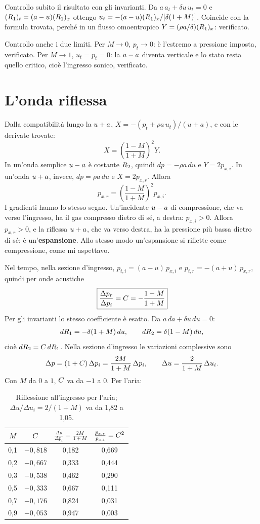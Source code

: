 Controllo subito il risultato con gli invarianti. Da $a\,a_t+\delta u\,u_t=0$ e $(R_1)_t=(a-u)(R_1)_x$ ottengo
$u_t=-(a-u)(R_1)_x/[\delta(1+M)]$. Coincide con la formula trovata, perché in un flusso omoentropico
$Y=(\rho a/\delta)(R_1)_x$: verificato.

Controllo anche i due limiti. Per $M\to0$, $p_t\to0$: è l'estremo a pressione imposta, verificato. Per $M\to1$,
$u_t=p_t=0$: la $u-a$ diventa verticale e lo stato resta quello critico, cioè l'ingresso sonico, verificato.

\section*{L'onda riflessa}
Dalla compatibilità lungo la $u+a$, $X=-(p_t+\rho a\,u_t)/(u+a)$, e con le derivate trovate:
\[
  X=\left(\frac{1-M}{1+M}\right)^2 Y .
\]
In un'onda semplice $u-a$ è costante $R_2$, quindi $dp=-\rho a\,du$ e $Y=2p_{x,i}$. In un'onda $u+a$, invece,
$dp=\rho a\,du$ e $X=2p_{x,r}$. Allora
\[
  p_{x,r}=\left(\frac{1-M}{1+M}\right)^2 p_{x,i}.
\]
I gradienti hanno lo stesso segno. Un'incidente $u-a$ di compressione, che va verso l'ingresso, ha il gas compresso
dietro di sé, a destra: $p_{x,i}>0$. Allora $p_{x,r}>0$, e la riflessa $u+a$, che va verso destra, ha la pressione
più bassa dietro di sé: è un'\textbf{espansione}. Allo stesso modo un'espansione si riflette come compressione,
come mi aspettavo.

Nel tempo, nella sezione d'ingresso, $p_{t,i}=(a-u)\,p_{x,i}$ e $p_{t,r}=-(a+u)\,p_{x,r}$, quindi per onde acustiche
\[
  \boxed{\frac{\Delta p_r}{\Delta p_i}=C=-\frac{1-M}{1+M}}
\]
Per gli invarianti lo stesso coefficiente è esatto. Da $a\,da+\delta u\,du=0$:
\begin{gather*}
  dR_1=-\delta(1+M)\,du ,\qquad dR_2=\delta(1-M)\,du,
\end{gather*}
cioè $dR_2=C\,dR_1$. Nella sezione d'ingresso le variazioni complessive sono
\begin{gather*}
  \Delta p=(1+C)\,\Delta p_i=\frac{2M}{1+M}\,\Delta p_i ,\qquad \Delta u=\frac{2}{1+M}\,\Delta u_i .
\end{gather*}
Con $M$ da $0$ a $1$, $C$ va da $-1$ a $0$. Per l'aria:

\begin{table}[H]
  \centering
  \begin{tabular}{cccc}
    \toprule
    $M$ & $C$ & $\frac{\Delta p}{\Delta p_i}=\frac{2M}{1+M}$ & $\frac{p_{x,r}}{p_{x,i}}=C^2$ \\
    \midrule
    0,1 & $-0{,}818$ & 0,182 & 0,669 \\
    0,2 & $-0{,}667$ & 0,333 & 0,444 \\
    0,3 & $-0{,}538$ & 0,462 & 0,290 \\
    0,5 & $-0{,}333$ & 0,667 & 0,111 \\
    0,7 & $-0{,}176$ & 0,824 & 0,031 \\
    0,9 & $-0{,}053$ & 0,947 & 0,003 \\
    \bottomrule
  \end{tabular}
  \caption{Riflessione all'ingresso per l'aria; $\Delta u/\Delta u_i=2/(1+M)$ va da 1,82 a 1,05.}
\end{table}

